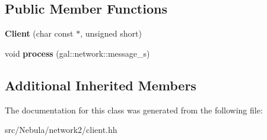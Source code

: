 \subsection*{Public Member Functions}
\begin{DoxyCompactItemize}
\item 
\hypertarget{classNeb_1_1Network_1_1Client_af42cd86a3ba20320503b774b4081ef20}{{\bfseries Client} (char const $\ast$, unsigned short)}\label{classNeb_1_1Network_1_1Client_af42cd86a3ba20320503b774b4081ef20}

\item 
\hypertarget{classNeb_1_1Network_1_1Client_a319d1d9e967e026b32b4124698a87e18}{void {\bfseries process} (gal\-::network\-::message\-\_\-s)}\label{classNeb_1_1Network_1_1Client_a319d1d9e967e026b32b4124698a87e18}

\end{DoxyCompactItemize}
\subsection*{Additional Inherited Members}


The documentation for this class was generated from the following file\-:\begin{DoxyCompactItemize}
\item 
src/\-Nebula/network2/client.\-hh\end{DoxyCompactItemize}
